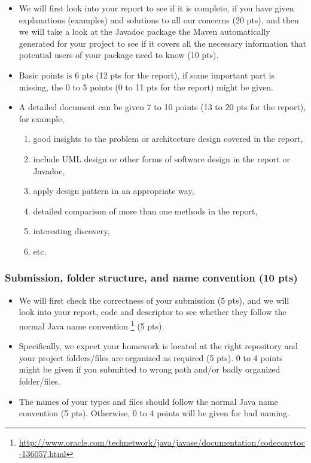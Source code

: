 \begin{itemize}

\item We will first look into your report to see if it is complete, if you have
given explanations (examples) and solutions to all our concerns (20 pts), and then we will
take a look at the Javadoc package the Maven automatically generated for your
project to see if it covers all the necessary information that potential users
of your package need to know (10 pts).

\item Basic points is 6 pts (12 pts for the report), if some
important part is missing, the 0 to 5 points (0 to 11 pts for the report) might be given.

\item A detailed document can be given 7 to 10 points (13 to 20 pts for the report), for example,

\begin{enumerate}
\item good insights to the problem or architecture design covered in the report,
\item include UML design or other forms of software design in the report or Javadoc,
\item apply design pattern in an appropriate way,
\item detailed comparison of more than one methods in the report,
\item interesting discovery,
\item etc.
\end{enumerate}

\end{itemize}

\subsubsection{Submission, folder structure, and name convention (10 pts)}

\begin{itemize}

\item We will first check the correctness of your submission (5 pts), 
and we will look into your report, code and descriptor to see whether they follow 
the normal Java name convention \footnote{\url{http://www.oracle.com/technetwork/java/javase/documentation/codeconvtoc-136057.html}} (5 pts).

\item Specifically, we expect your homework is located at the right repository 
and your project folders/files are organized as required (5 pts). 
0 to 4 points might be given if you submitted to wrong path and/or badly organized folder/files. 

\item The names of your types and files should follow the normal Java name convention (5 pts). 
Otherwise, 0 to 4 points will be given for bad naming. 


\end{itemize}

